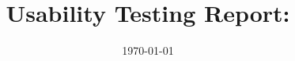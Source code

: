 \documentclass[12pt, titlepage]{article}
\begin{document}
\title{Usability Testing Report: \progname}
\author{\authname}
\date{\today}

\maketitle













\end{document}
